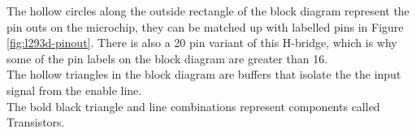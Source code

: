 \documentclass[../TinyBot.tex]{subfiles}
\begin{document}
The hollow circles along the outside rectangle of the block diagram represent the pin outs on the microchip, they can be matched up with labelled pins in Figure \ref{fig:l293d-pinout}. There is also a 20 pin variant of this H-bridge, which is why some of the pin labels on the block diagram are greater than 16.\\


The hollow triangles in the block diagram are buffers that isolate the the input signal from the enable line. \\



The bold black triangle and line combinations represent components called Transistors. 





    
        

\end{document}
